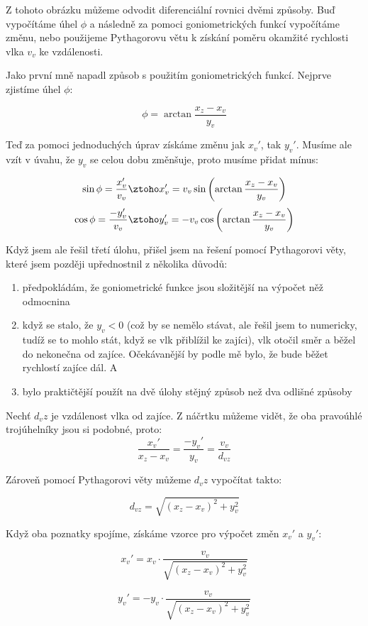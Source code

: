 \documentclass{fkssolpub}
\begin{document}
Z tohoto obrázku můžeme odvodit diferenciální rovnici dvěmi způsoby. Buď
vypočítáme úhel $\phi$ a následně za pomoci goniometrických funkcí vypočítáme
změnu, nebo použijeme Pythagorovu větu k získání poměru okamžité rychlosti
vlka $v_v$ ke vzdálenosti.

Jako první mně napadl způsob s použitím goniometrických funkcí. Nejprve
zjistíme úhel $\phi$:

\[
  \phi = \arctan \frac{x_z - x_v}{y_v}
\]

Teď za pomoci jednoduchých úprav získáme změnu jak $x_v'$, tak $y_v'$.
Musíme ale vzít v úvahu, že $y_v$ se celou dobu změnšuje, proto
musíme přidat mínus:

\[
  \sin \phi = \frac{x_v'}{v_v} \ztoho x_v' = v_v \sin\left(\arctan \frac{x_z - x_v}{y_v}\right)
\]
\[
  \cos \phi = \frac{- y_v'}{v_v} \ztoho y_v' = - v_v \cos\left(\arctan \frac{x_z - x_v}{y_v}\right)
\]

Když jsem ale řešil třetí úlohu, přišel jsem na řešení pomocí Pythagorovi
věty, které jsem později upřednostnil z několika důvodů:

\begin{enumerate}
  \item předpokládám, že goniometrické funkce jsou složitější na výpočet
    něž odmocnina 
  \item když se stalo, že $y_v < 0$ (což by se nemělo stávat, ale
    řešil jsem to numericky, tudíž se to mohlo stát, když se vlk
    přiblížil ke zajíci), vlk otočil směr a běžel do nekonečna
    od zajíce. Očekávanější by podle mě bylo, že bude běžet
    rychlostí zajíce dál. A 
  \item bylo praktičtější použít na dvě úlohy stějný způsob
    než dva odlišné způsoby 
\end{enumerate}

Nechť $d_vz$ je vzdálenost vlka od zajíce. Z náčrtku můžeme vidět, že
oba pravoúhlé trojúhelníky jsou si podobné, proto: 
\[
  \frac{x_v'}{x_z - x_v} = \frac{- y_v'}{y_v} = \frac{v_v}{d_{vz}}
\]

Zároveň pomocí Pythagorovi věty můžeme $d_vz$ vypočítat takto:

\[
  d_{vz} = \sqrt{(x_z - x_v)^2 + y_v^2}
\]

Když oba poznatky spojíme, získáme vzorce pro výpočet změn $x_v'$ a $y_v'$:

\[
  x_v' = x_v \cdot \frac{v_v}{\sqrt{(x_z - x_v)^2 + y_v^2}}
\]

\[
  y_v' = - y_v \cdot \frac{v_v}{\sqrt{(x_z - x_v)^2 + y_v^2}}
\]
\end{document}
